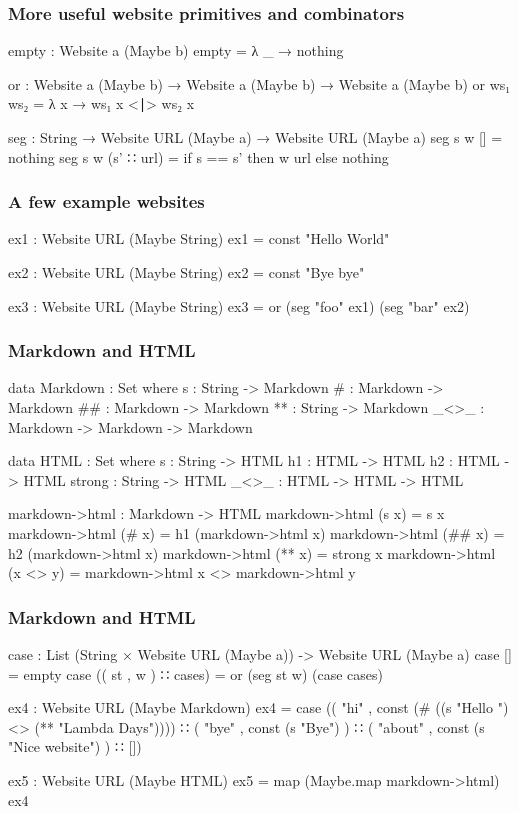 \documentclass[aspectratio=169]{beamer}
\begin{document}
\begin{frame}
\frametitle{More useful website primitives and combinators}
\begin{code}
  empty : Website a (Maybe b)
  empty = λ _ → nothing
  
  or : Website a (Maybe b) → Website a (Maybe b) → Website a (Maybe b)
  or ws₁ ws₂ = λ x → ws₁ x <∣> ws₂ x
  
  seg : String → Website URL (Maybe a) → Website URL (Maybe a)
  seg s w [] = nothing
  seg s w (s' ∷ url) = if s == s' then w url else nothing
\end{code}
\end{frame}

\begin{frame}
\frametitle{A few example websites}
\begin{code}
  ex1 : Website URL (Maybe String)
  ex1 = const "Hello World"
  
  ex2 : Website URL (Maybe String)
  ex2 = const "Bye bye"
  
  ex3 : Website URL (Maybe String)
  ex3 = or (seg "foo" ex1)
           (seg "bar" ex2)
\end{code}
\end{frame}

\begin{frame}
\frametitle{Markdown and HTML}
\begin{code}
  data Markdown : Set where
    s : String -> Markdown
    # : Markdown -> Markdown
    ## : Markdown -> Markdown
    ** : String -> Markdown
    _<>_ : Markdown -> Markdown -> Markdown
  
  data HTML : Set where
    s : String -> HTML
    h1 : HTML -> HTML
    h2 : HTML -> HTML
    strong : String -> HTML
    _<>_ : HTML -> HTML -> HTML

  markdown->html : Markdown -> HTML
  markdown->html (s x) = s x
  markdown->html (# x) = h1 (markdown->html x)
  markdown->html (## x) = h2 (markdown->html x)
  markdown->html (** x) = strong x
  markdown->html (x <> y) = markdown->html x <> markdown->html y
\end{code}
\end{frame}

\begin{frame}
\frametitle{Markdown and HTML}
\begin{code}
  case : List (String × Website URL (Maybe a)) -> Website URL (Maybe a)
  case [] = empty
  case (( st , w ) ∷ cases) = or (seg st w) (case cases)
  
  ex4 : Website URL (Maybe Markdown)
  ex4 = case (( "hi" , const (# ((s "Hello ") <> (** "Lambda Days")))) ∷
              ( "bye" , const (s "Bye") ) ∷
              ( "about" , const (s "Nice website") ) ∷
              [])
  
  ex5 : Website URL (Maybe HTML)
  ex5 = map (Maybe.map markdown->html) ex4
\end{code}
\end{frame}
\end{document}
